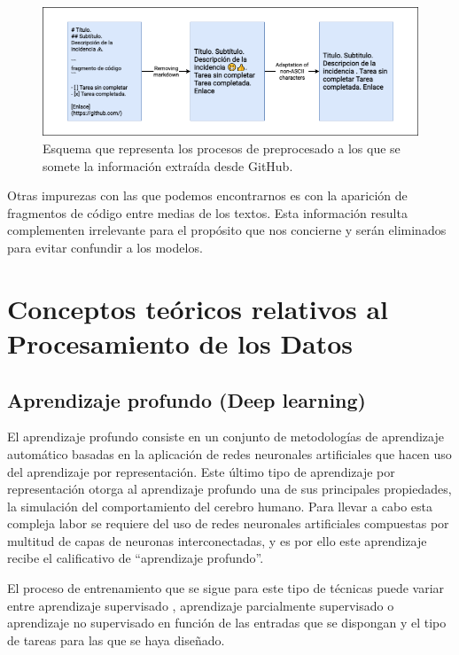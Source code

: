 \begin{figure}[!ht]
	\centering
\includegraphics[width=\textwidth]{img/extraction_preprocessing_process.png}
	\caption{Esquema que representa los procesos de preprocesado a los que se somete la información extraída desde GitHub.}
	\label{fig:apply_preprocessing}
\end{figure}

Otras impurezas con las que podemos encontrarnos es con la aparición de fragmentos de código entre medias de los textos. Esta información resulta complementen irrelevante para el propósito que nos concierne y serán eliminados para evitar confundir a los modelos.

\section{Conceptos teóricos relativos al Procesamiento de los Datos} \label{sec:procesamientodatos}

\subsection{Aprendizaje profundo (Deep learning)} \label{sec:deeplearning}

El aprendizaje profundo \cite{ct:deep_learning} consiste en un conjunto de metodologías de aprendizaje automático basadas en la aplicación de redes neuronales artificiales que hacen uso del aprendizaje por representación. Este último tipo de aprendizaje por representación otorga al aprendizaje profundo una de sus principales propiedades, la simulación del comportamiento del cerebro humano. Para llevar a cabo esta compleja labor se requiere del uso de redes neuronales artificiales compuestas por multitud de capas de neuronas interconectadas, y es por ello este aprendizaje recibe el calificativo de “aprendizaje profundo”.

El proceso de entrenamiento que se sigue para este tipo de técnicas puede variar entre aprendizaje supervisado \cite{wiki:supervised_learning}, aprendizaje parcialmente supervisado \cite{wiki:semi_supervised_learning} o aprendizaje no supervisado \cite{wiki:unsupervised_learning} en función de las entradas que se dispongan y el tipo de tareas para las que se haya diseñado.

